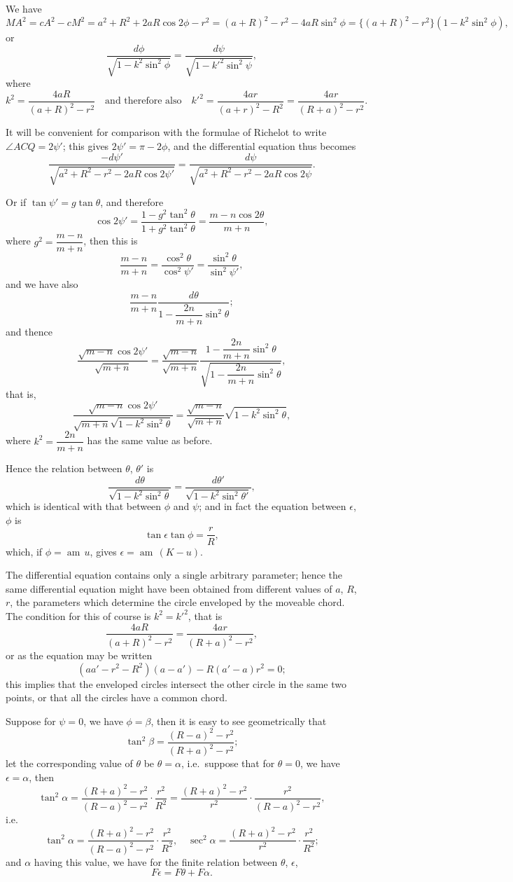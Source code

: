 \documentclass[11pt,a4paper]{book}
\begin{document}
{{We have
\[
MA^2 = cA^2 - cM^2 = a^2 + R^2 + 2aR\cos 2\phi - r^2 = (a+R)^2 - r^2 - 4aR\sin^2\phi = \{(a+R)^2 - r^2\}(1 - k^2\sin^2\phi),
\]
or
\[
\frac{d\phi}{\sqrt{1-k^2\sin^2\phi}} = \frac{d\psi}{\sqrt{1-k'^2\sin^2\psi}},
\]
where
\[
k^2 = \frac{4aR}{(a+R)^2-r^2} \quad \text{and therefore also} \quad k'^2 = \frac{4ar}{(a+r)^2-R^2} = \frac{4ar}{(R+a)^2-r^2}.
\]

It will be convenient for comparison with the formulae of Richelot to write $\angle ACQ = 2\psi'$; this gives $2\psi' = \pi - 2\phi$, and the differential equation thus becomes
\[
\frac{-d\psi'}{\sqrt{a^2+R^2-r^2-2aR\cos 2\psi'}} = \frac{d\psi}{\sqrt{a^2+R^2-r^2-2aR\cos 2\psi}}.
\]

Or if $\tan\psi' = g\tan\theta$, and therefore
\[
\cos 2\psi' = \frac{1-g^2\tan^2\theta}{1+g^2\tan^2\theta} = \frac{m-n\cos 2\theta}{m+n},
\]
where $g^2 = \dfrac{m-n}{m+n}$, then this is
\[
\frac{m-n}{m+n} = \frac{\cos^2\theta}{\cos^2\psi'} = \frac{\sin^2\theta}{\sin^2\psi'},
\]
and we have also
\[
\frac{m-n}{m+n}\frac{d\theta}{1-\dfrac{2n}{m+n}\sin^2\theta};
\]
and thence
\[
\frac{\sqrt{m-n}\cos 2\psi'}{\sqrt{m+n}} = \frac{\sqrt{m-n}}{\sqrt{m+n}}\frac{1-\dfrac{2n}{m+n}\sin^2\theta}{\sqrt{1-\dfrac{2n}{m+n}\sin^2\theta}},
\]
that is,
\[
\frac{\sqrt{m-n}\cos 2\psi'}{\sqrt{m+n}\sqrt{1-k^2\sin^2\theta}} = \frac{\sqrt{m-n}}{\sqrt{m+n}}\sqrt{1-k^2\sin^2\theta},
\]
where $k^2 = \dfrac{2n}{m+n}$ has the same value as before.

Hence the relation between $\theta$, $\theta'$ is
\[
\frac{d\theta}{\sqrt{1-k^2\sin^2\theta}} = \frac{d\theta'}{\sqrt{1-k^2\sin^2\theta'}},
\]
which is identical with that between $\phi$ and $\psi$; and in fact the equation between $\epsilon$, $\phi$ is
\[
\tan\epsilon \tan\phi = \frac{r}{R},
\]
which, if $\phi = \operatorname{am}\,u$, gives $\epsilon = \operatorname{am}\,(K-u)$.

The differential equation contains only a single arbitrary parameter; hence the same differential equation might have been obtained from different values of $a$, $R$, $r$, the parameters which determine the circle enveloped by the moveable chord. The condition for this of course is $k^2 = k'^2$, that is
\[
\frac{4aR}{(a+R)^2-r^2} = \frac{4ar}{(R+a)^2-r^2},
\]
or as the equation may be written
\[
(aa' - r^2 - R^2)(a - a') - R(a' - a)r^2 = 0;
\]
this implies that the enveloped circles intersect the other circle in the same two points, or that all the circles have a common chord.
\newpage

Suppose for $\psi = 0$, we have $\phi = \beta$, then it is easy to see geometrically that
\[
\tan^2\beta = \frac{(R-a)^2-r^2}{(R+a)^2-r^2};
\]
let the corresponding value of $\theta$ be $\theta = \alpha$, i.e.\ suppose that for $\theta = 0$, we have $\epsilon = \alpha$, then
\[
\tan^2\alpha = \frac{(R+a)^2-r^2}{(R-a)^2-r^2} \cdot \frac{r^2}{R^2} = \frac{(R+a)^2-r^2}{r^2} \cdot \frac{r^2}{(R-a)^2-r^2},
\]
i.e.
\[
\tan^2\alpha = \frac{(R+a)^2-r^2}{(R-a)^2-r^2} \cdot \frac{r^2}{R^2}, \quad \sec^2\alpha = \frac{(R+a)^2-r^2}{r^2} \cdot \frac{r^2}{R^2};
\]
and $\alpha$ having this value, we have for the finite relation between $\theta$, $\epsilon$,
\[
F\epsilon = F\theta + F\alpha.
\]

}}
\end{document}
